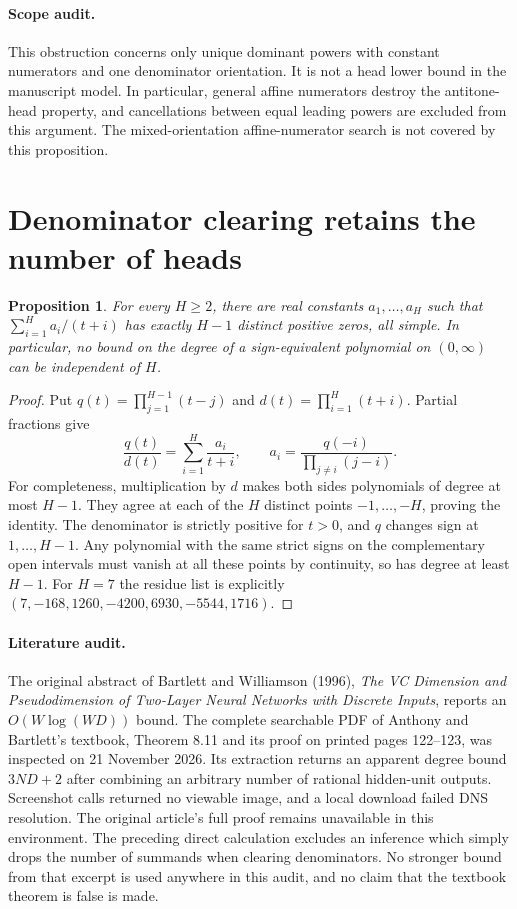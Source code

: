 \documentclass[11pt]{article}
\newtheorem{proposition}{Proposition}
\begin{document}
\paragraph{Scope audit.}
This obstruction concerns only unique dominant powers with constant
numerators and one denominator orientation. It is not a head lower
bound in the manuscript model. In particular, general affine
numerators destroy the antitone-head property, and cancellations
between equal leading powers are excluded from this argument.
The mixed-orientation affine-numerator search is not
covered by this proposition.

\section{Denominator clearing retains the number of heads}

\begin{proposition}
For every $H\geq2$, there are real constants $a_1,\ldots,a_H$
such that $\sum_{i=1}^H a_i/(t+i)$ has exactly $H-1$ distinct
positive zeros, all simple. In particular, no bound on the degree
of a sign-equivalent polynomial on $(0,\infty)$ can be independent
of $H$.
\end{proposition}
\begin{proof}
Put $q(t)=\prod_{j=1}^{H-1}(t-j)$ and
$d(t)=\prod_{i=1}^H(t+i)$. Partial fractions give
\[
 \frac{q(t)}{d(t)}=\sum_{i=1}^H\frac{a_i}{t+i},\qquad
 a_i=\frac{q(-i)}{\prod_{j\ne i}(j-i)}.
\]
For completeness, multiplication by $d$ makes both sides
polynomials of degree at most $H-1$. They agree at each of the
$H$ distinct points $-1,\ldots,-H$, proving the identity.
The denominator is strictly positive for $t>0$, and $q$ changes
sign at $1,\ldots,H-1$. Any polynomial with the same strict signs
on the complementary open intervals must vanish at all these
points by continuity, so has degree at least $H-1$.
For $H=7$ the residue list is explicitly
$(7,-168,1260,-4200,6930,-5544,1716)$.
\end{proof}

\paragraph{Literature audit.}
The original abstract of Bartlett and Williamson (1996),
\emph{The VC Dimension and Pseudodimension of Two-Layer Neural
Networks with Discrete Inputs}, reports an $O(W\log(WD))$
bound. The complete searchable PDF of Anthony and Bartlett's textbook,
Theorem 8.11 and its proof on printed pages 122--123, was inspected
on 21 November 2026. Its extraction returns an apparent degree
bound $3ND+2$ after combining an arbitrary number of rational
hidden-unit outputs. Screenshot calls returned no viewable image,
and a local download failed DNS resolution. The original article's
full proof remains unavailable in this environment.
The preceding direct calculation excludes an inference which simply
drops the number of summands when clearing denominators. No
stronger bound from that excerpt is used anywhere in this audit,
and no claim that the textbook theorem is false is made.
\end{document}
